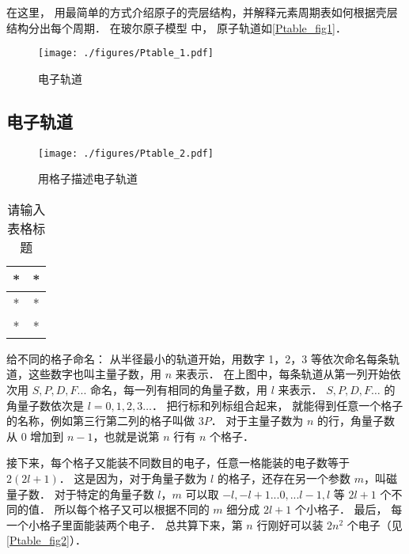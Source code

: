 
\begin{issues}
\issueTODO
\end{issues}

在这里， 用最简单的方式介绍原子的壳层结构，并解释元素周期表如何根据壳层结构分出每个周期． 在玻尔原子模型 中， 原子轨道如\autoref{Ptable_fig1}．

\begin{figure}[ht]
\centering
\texttt{[image: ./figures/Ptable\_1.pdf]}
\caption{电子轨道}\label{Ptable_fig1}
\end{figure}

\subsection{电子轨道}
\begin{figure}[ht]
\centering
\texttt{[image: ./figures/Ptable\_2.pdf]}
\caption{用格子描述电子轨道} 
\end{figure}

\begin{table}[ht]
\centering
\caption{请输入表格标题}\label{Ptable_tab1}
\begin{tabular}{|c|c|}
\hline
* & * \\
\hline
* & * \\
\hline
* & * \\
\hline
\end{tabular}
\end{table}

给不同的格子命名： 从半径最小的轨道开始，用数字 1，2，3 等依次命名每条轨道，这些数字也叫主量子数，用 $n$ 来表示． 在上图中，每条轨道从第一列开始依次用 $S,P,D,F...$ 命名，每一列有相同的角量子数，用 $l$ 来表示．  $S,P,D,F\dots$ 的角量子数依次是 $l = 0,1,2,3\dots$． 把行标和列标组合起来， 就能得到任意一个格子的名称，例如第三行第二列的格子叫做 $3P$． 对于主量子数为 $n$ 的行，角量子数从 0 增加到 $n-1$，也就是说第 $n$ 行有 $n$ 个格子．

接下来，每个格子又能装不同数目的电子，任意一格能装的电子数等于 $2(2l + 1)$． 这是因为，对于角量子数为 $l$ 的格子，还存在另一个参数 $m$，叫磁量子数． 对于特定的角量子数 $l$，$m$ 可以取 $ - l, - l + 1...0,...l - 1,l$ 等 $2l + 1$ 个不同的值． 所以每个格子又可以根据不同的 $m$ 细分成 $2l+1$ 个小格子． 最后， 每一个小格子里面能装两个电子． 总共算下来，第 $n$ 行刚好可以装 $2n^2$ 个电子（见\autoref{Ptable_fig2}）．


